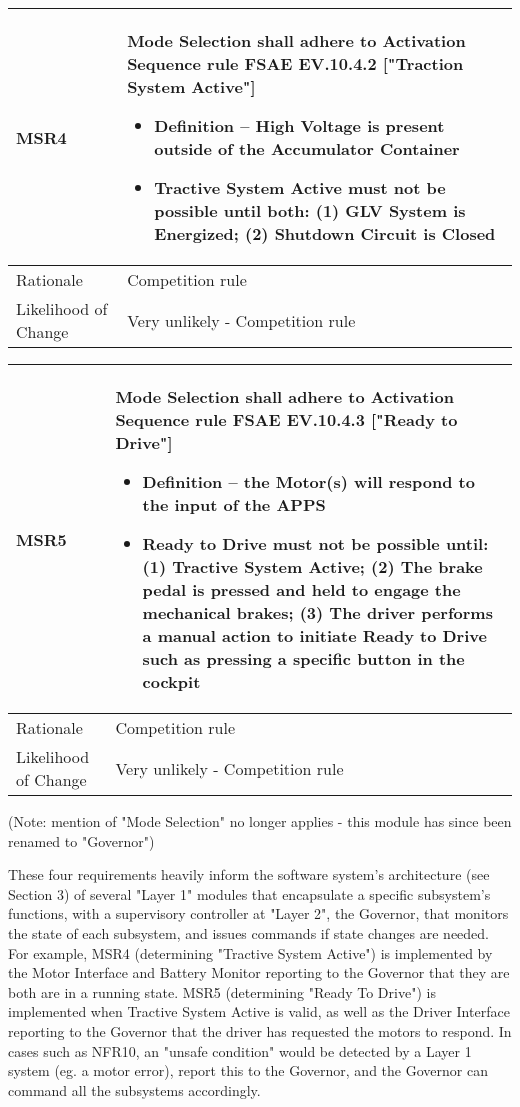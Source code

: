 \documentclass[12pt, titlepage]{article}
\newcommand{\tableVspace}{5mm}
\newcommand{\ReqColA}{0.13\textwidth}
\newcommand{\ReqColB}{0.82\textwidth}
\begin{document}
\vspace{\tableVspace}
\noindent
\begin{tabular}{| p{\ReqColA} | p{\ReqColB}|}
\hline
\rowcolor[gray]{0.9}
MSR4 & Mode Selection shall adhere to Activation Sequence rule FSAE EV.10.4.2 ["Traction System Active"] 
\begin{itemize}
    \item Definition – High Voltage is present outside of the Accumulator Container
    \item Tractive System Active must not be possible until both: (1) GLV System is Energized; (2) Shutdown Circuit is Closed
\end{itemize} \\
\hline
Rationale & Competition rule\\
\hline
Likelihood of Change & Very unlikely - Competition rule \\
\hline
\end{tabular} 

\vspace{\tableVspace}
\noindent
\begin{tabular}{| p{\ReqColA} | p{\ReqColB}|}
\hline
\rowcolor[gray]{0.9}
MSR5 & Mode Selection shall adhere to Activation Sequence rule FSAE EV.10.4.3 ["Ready to Drive"] 
\begin{itemize}
    \item Definition – the Motor(s) will respond to the input of the APPS
    \item Ready to Drive must not be possible until: (1) Tractive System Active; (2) The brake pedal is pressed and held to engage the mechanical brakes; (3) The driver performs a manual action to initiate Ready to Drive
    such as pressing a specific button in the cockpit
\end{itemize} \\
\hline
Rationale & Competition rule\\
\hline
Likelihood of Change & Very unlikely - Competition rule \\
\hline
\end{tabular}

\vspace{2mm}
\noindent
(Note: mention of "Mode Selection" no longer applies - this module has since been renamed to "Governor")

These four requirements heavily inform the software system's architecture (see Section 3) of several "Layer 1" modules that encapsulate a specific subsystem's functions, with a supervisory controller at "Layer 2", the Governor, that monitors the state of each subsystem, and issues commands if state changes are needed. For example, MSR4 (determining "Tractive System Active") is implemented by the Motor Interface and Battery Monitor reporting to the Governor that they are both are in a running state. MSR5 (determining "Ready To Drive") is implemented when Tractive System Active is valid, as well as the Driver Interface reporting to the Governor that the driver has requested the motors to respond. In cases such as NFR10, an "unsafe condition" would be detected by a Layer 1 system (eg. a motor error), report this to the Governor, and the Governor can command all the subsystems accordingly.
\end{document}
